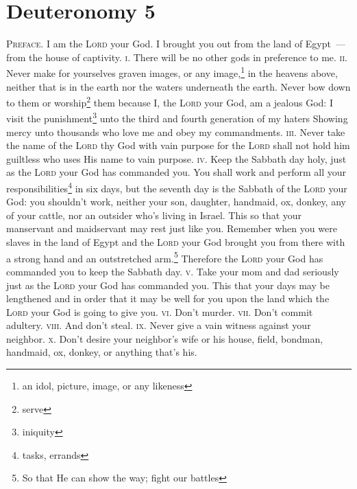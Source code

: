 \section{Deuteronomy 5}\label{Deuteronomy 5}
\begin{enumerate}[align=center]
     \textsc{Preface.} I am the \textsc{Lord} your God. I brought you out from the land of Egypt~--- from the house of captivity.%
     \textsc{i.} There will be no other gods in preference to me.%
     \textsc{ii.} Never make for yourselves graven images, or any image,\footnote{an idol, picture, image, or any likeness} in the heavens above, neither that is in the earth nor the waters underneath the earth.%
     Never bow down to them or worship\footnote{serve} them because I, the \textsc{Lord} your God, am a jealous God: I visit the punishment\footnote{iniquity} unto the third and fourth generation of my haters%
     Showing mercy unto thousands who love me and obey my commandments.%
     \textsc{iii.} Never take the name of the \textsc{Lord} thy God with vain purpose for the \textsc{Lord} shall not hold him guiltless who uses His name to vain purpose.%
     \textsc{iv.} Keep the Sabbath day holy, just as the \textsc{Lord} your God has commanded you.%
     You shall work and perform all your responsibilities\footnote{tasks, errands} in six days,%
     but the seventh day is the Sabbath of the \textsc{Lord} your God: you shouldn't work, neither your son, daughter, handmaid, ox, donkey, any of your cattle, nor an outsider who's living in Israel. This so that your manservant and maidservant may rest just like you.%
     Remember when you were slaves in the land of Egypt and the \textsc{Lord} your God brought you from there with a strong hand and an outstretched arm.\footnote{So that He can show the way; fight our battles} Therefore the \textsc{Lord} your God has commanded you to keep the Sabbath day.%
     \textsc{v.} Take your mom and dad seriously just as the \textsc{Lord} your God has commanded you. This that your days may be lengthened and in order that it may be well for you upon the land which the \textsc{Lord} your God is going to give you.%
     \textsc{vi.} Don't murder.%
     \textsc{vii.} Don't commit adultery.%
     \textsc{viii.} And don't steal.%
     \textsc{ix.} Never give a vain witness against your neighbor.%
     \textsc{x.} Don't desire your neighbor's wife or his house, field, bondman, handmaid, ox, donkey, or anything that's his.%
\end{enumerate}
